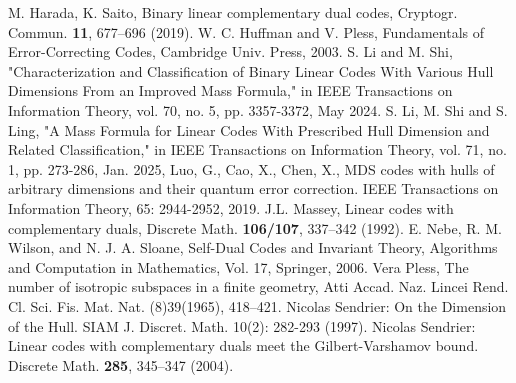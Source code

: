 \documentclass[a4paper,11pt]{article}
\begin{document}
\begin{thebibliography}{}
M. Harada, K. Saito, Binary linear complementary dual codes, Cryptogr. Commun. \textbf{11}, 677--696 (2019).
 W. C. Huffman and V. Pless, Fundamentals of Error-Correcting Codes,
    Cambridge Univ. Press, 2003.
S. Li and M. Shi, "Characterization and Classification of Binary Linear Codes With Various Hull Dimensions From an Improved Mass Formula," in IEEE Transactions on Information Theory, vol. 70, no. 5, pp. 3357-3372, May 2024.
S. Li, M. Shi and S. Ling, "A Mass Formula for Linear Codes With Prescribed Hull Dimension and Related Classification," in IEEE Transactions on Information Theory, vol. 71, no. 1, pp. 273-286, Jan. 2025, %
Luo, G., Cao, X., Chen, X., MDS codes with hulls of arbitrary dimensions and their quantum error correction. IEEE Transactions on Information Theory, 65: 2944-2952, 2019.
J.L. Massey, Linear codes with complementary duals, Discrete Math.
\textbf{106/107}, 337--342 (1992).
E. Nebe, R. M. Wilson, and N. J. A. Sloane, Self-Dual Codes and Invariant Theory, Algorithms and Computation in Mathematics, Vol. 17, Springer, 2006.
Vera Pless, The number of isotropic subspaces in a finite geometry, Atti Accad. Naz. Lincei Rend. Cl. Sci. Fis. Mat. Nat. (8)39(1965), 418--421.
Nicolas Sendrier:
On the Dimension of the Hull. SIAM J. Discret. Math. 10(2): 282-293 (1997).
Nicolas Sendrier:
Linear codes with complementary duals meet the Gilbert-Varshamov bound. Discrete Math.
\textbf{285}, 345--347 (2004).


%
%

\end{thebibliography}
\end{document}
